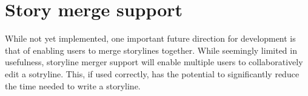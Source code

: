 \documentclass[12pt,letterpaper]{article}
\begin{document}
\section{Story merge support}

While not yet implemented, one important future direction for development is that of enabling
users to merge storylines together. While seemingly limited in usefulness, storyline merger
support will enable multiple users to collaboratively edit a sotryline. This, if used correctly, has
the potential to significantly reduce the time needed to write a storyline.
\end{document}
